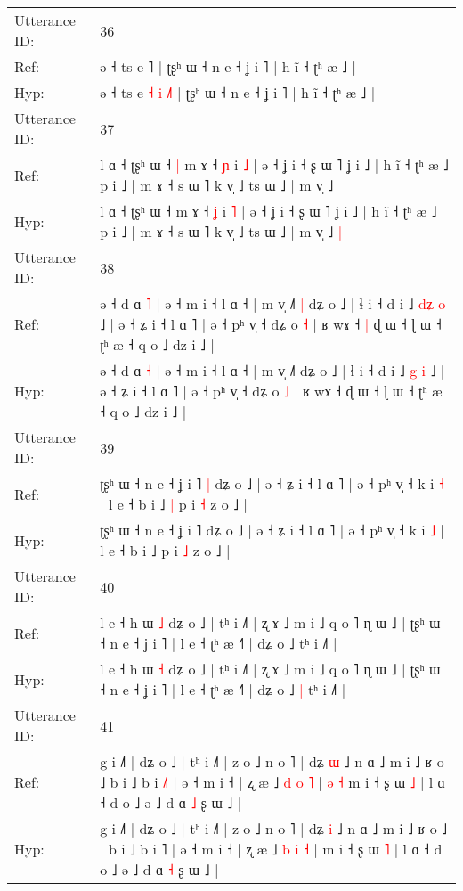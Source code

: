 \documentclass[10pt]{article}
\DeclareRobustCommand{\hl}[1]{{\textcolor{red}{#1}}}
\begin{document}
\begin{longtable}{ll}
 \\
\midrule
Utterance ID: & 36 \\
Ref: & ə ˧ ts e\hl{}\hl{}\hl{}\hl{} \hl{}˥ | ʈʂʰ ɯ ˧ n e ˧ ʝ i ˥ | h ĩ ˧ ʈʰ æ ˩ |
 \\
Hyp: & ə ˧ ts e\hl{ }\hl{˧}\hl{ }\hl{i} \hl{˩}˥ | ʈʂʰ ɯ ˧ n e ˧ ʝ i ˥ | h ĩ ˧ ʈʰ æ ˩ |
 \\
\midrule
Utterance ID: & 37 \\
Ref: & l ɑ ˧ ʈʂʰ ɯ ˧\hl{ }\hl{|} m ɤ ˧ \hl{ɲ} i \hl{˩} | ə ˧ ʝ i ˧ ʂ ɯ ˥ ʝ i ˩ | h ĩ ˧ ʈʰ æ ˩ p i ˩ | m ɤ ˧ s ɯ ˥ k v̩ ˩ ts ɯ ˩ | m v̩ ˩\hl{}\hl{}
 \\
Hyp: & l ɑ ˧ ʈʂʰ ɯ ˧\hl{}\hl{} m ɤ ˧ \hl{ʝ} i \hl{˥} | ə ˧ ʝ i ˧ ʂ ɯ ˥ ʝ i ˩ | h ĩ ˧ ʈʰ æ ˩ p i ˩ | m ɤ ˧ s ɯ ˥ k v̩ ˩ ts ɯ ˩ | m v̩ ˩\hl{ }\hl{|}
 \\
\midrule
Utterance ID: & 38 \\
Ref: & ə ˧ d ɑ \hl{˥} | ə ˧ m i ˧ l ɑ ˧ | m v̩ ˩˥\hl{ }\hl{|} dʑ o ˩ | ɬ i ˧ d i ˩ \hl{d}\hl{ʑ} \hl{o} ˩ | ə ˧ ʑ i ˧ l ɑ ˥ | ə ˧ pʰ v̩ ˧ dʑ o \hl{˧} | ʁ wɤ ˧\hl{ }\hl{|} ɖ ɯ ˧ ɭ ɯ ˧ ʈʰ æ ˧ q o ˩ dz i ˩ |
 \\
Hyp: & ə ˧ d ɑ \hl{˧} | ə ˧ m i ˧ l ɑ ˧ | m v̩ ˩˥\hl{}\hl{} dʑ o ˩ | ɬ i ˧ d i ˩ \hl{}\hl{g} \hl{i} ˩ | ə ˧ ʑ i ˧ l ɑ ˥ | ə ˧ pʰ v̩ ˧ dʑ o \hl{˩} | ʁ wɤ ˧\hl{}\hl{} ɖ ɯ ˧ ɭ ɯ ˧ ʈʰ æ ˧ q o ˩ dz i ˩ |
 \\
\midrule
Utterance ID: & 39 \\
Ref: & ʈʂʰ ɯ ˧ n e ˧ ʝ i ˥\hl{ }\hl{|} dʑ o ˩ | ə ˧ ʑ i ˧ l ɑ ˥ | ə ˧ pʰ v̩ ˧ k i \hl{˧} | l e ˧ b i ˩\hl{ }\hl{|} p i \hl{˧} z o ˩ |
 \\
Hyp: & ʈʂʰ ɯ ˧ n e ˧ ʝ i ˥\hl{}\hl{} dʑ o ˩ | ə ˧ ʑ i ˧ l ɑ ˥ | ə ˧ pʰ v̩ ˧ k i \hl{˩} | l e ˧ b i ˩\hl{}\hl{} p i \hl{˩} z o ˩ |
 \\
\midrule
Utterance ID: & 40 \\
Ref: & l e ˧ h ɯ \hl{˩} dʑ o ˩ | tʰ i ˩˥ | ʐ ɤ ˩ m i ˩ q o ˥ ɳ ɯ ˩ | ʈʂʰ ɯ ˧ n e ˧ ʝ i ˥ | l e ˧ ʈʰ æ ˧˥ | dʑ o ˩\hl{}\hl{} tʰ i ˩˥ |
 \\
Hyp: & l e ˧ h ɯ \hl{˧} dʑ o ˩ | tʰ i ˩˥ | ʐ ɤ ˩ m i ˩ q o ˥ ɳ ɯ ˩ | ʈʂʰ ɯ ˧ n e ˧ ʝ i ˥ | l e ˧ ʈʰ æ ˧˥ | dʑ o ˩\hl{ }\hl{|} tʰ i ˩˥ |
 \\
\midrule
Utterance ID: & 41 \\
Ref: & g i ˩˥ | dʑ o ˩ | tʰ i ˩˥ | z o ˩ n o ˥ | dʑ \hl{ɯ} ˩ n ɑ ˩ m i ˩ ʁ o ˩\hl{}\hl{} b i ˩ b i \hl{˩}˥ | ə ˧ m i ˧ | ʐ æ ˩ \hl{d} \hl{o} \hl{˥} |\hl{ }\hl{ə}\hl{ }\hl{˧} m i ˧ ʂ ɯ \hl{˩} | l ɑ ˧ d o ˩ ə ˩ d ɑ \hl{˩} ʂ ɯ ˩ |
 \\
Hyp: & g i ˩˥ | dʑ o ˩ | tʰ i ˩˥ | z o ˩ n o ˥ | dʑ \hl{i} ˩ n ɑ ˩ m i ˩ ʁ o ˩\hl{ }\hl{|} b i ˩ b i \hl{}˥ | ə ˧ m i ˧ | ʐ æ ˩ \hl{b} \hl{i} \hl{˧} |\hl{}\hl{}\hl{}\hl{} m i ˧ ʂ ɯ \hl{˥} | l ɑ ˧ d o ˩ ə ˩ d ɑ \hl{˧} ʂ ɯ ˩ |

\end{longtable}
\end{document}
